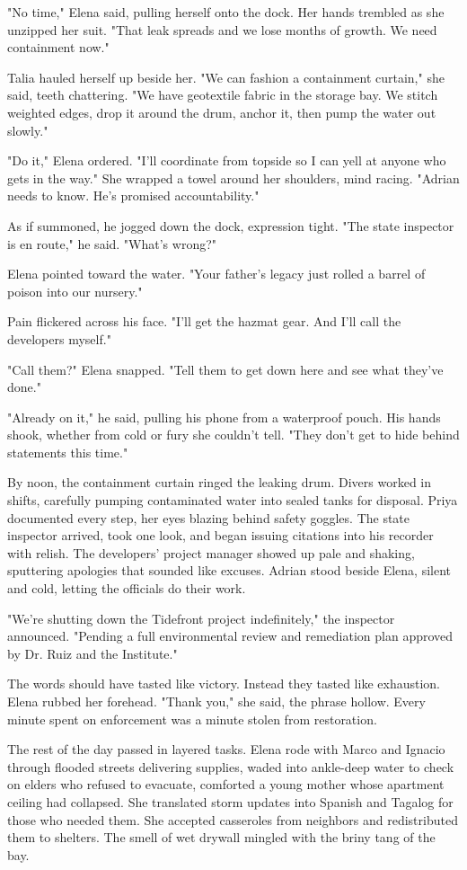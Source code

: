 "No time," Elena said, pulling herself onto the dock. Her hands trembled as she unzipped her suit. "That leak spreads and we lose months of growth. We need containment now."

Talia hauled herself up beside her. "We can fashion a containment curtain," she said, teeth chattering. "We have geotextile fabric in the storage bay. We stitch weighted edges, drop it around the drum, anchor it, then pump the water out slowly."

"Do it," Elena ordered. "I'll coordinate from topside so I can yell at anyone who gets in the way." She wrapped a towel around her shoulders, mind racing. "Adrian needs to know. He's promised accountability."

As if summoned, he jogged down the dock, expression tight. "The state inspector is en route," he said. "What's wrong?"

Elena pointed toward the water. "Your father's legacy just rolled a barrel of poison into our nursery."

Pain flickered across his face. "I'll get the hazmat gear. And I'll call the developers myself."

"Call them?" Elena snapped. "Tell them to get down here and see what they've done."

"Already on it," he said, pulling his phone from a waterproof pouch. His hands shook, whether from cold or fury she couldn't tell. "They don't get to hide behind statements this time."

By noon, the containment curtain ringed the leaking drum. Divers worked in shifts, carefully pumping contaminated water into sealed tanks for disposal. Priya documented every step, her eyes blazing behind safety goggles. The state inspector arrived, took one look, and began issuing citations into his recorder with relish. The developers' project manager showed up pale and shaking, sputtering apologies that sounded like excuses. Adrian stood beside Elena, silent and cold, letting the officials do their work.

"We're shutting down the Tidefront project indefinitely," the inspector announced. "Pending a full environmental review and remediation plan approved by Dr. Ruiz and the Institute."

The words should have tasted like victory. Instead they tasted like exhaustion. Elena rubbed her forehead. "Thank you," she said, the phrase hollow. Every minute spent on enforcement was a minute stolen from restoration.

The rest of the day passed in layered tasks. Elena rode with Marco and Ignacio through flooded streets delivering supplies, waded into ankle-deep water to check on elders who refused to evacuate, comforted a young mother whose apartment ceiling had collapsed. She translated storm updates into Spanish and Tagalog for those who needed them. She accepted casseroles from neighbors and redistributed them to shelters. The smell of wet drywall mingled with the briny tang of the bay.

